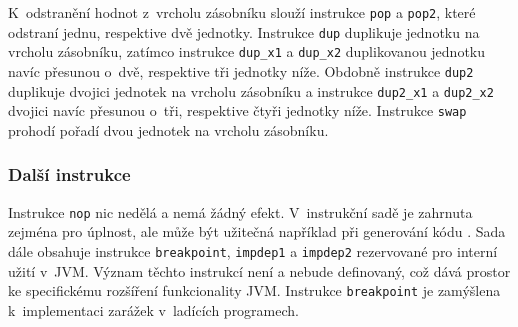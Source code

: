 K~odstranění hodnot z~vrcholu zásobníku slouží instrukce \texttt{pop} a \texttt{pop2}, které odstraní jednu, respektive dvě jednotky. Instrukce \texttt{dup} duplikuje jednotku na vrcholu zásobníku, zatímco instrukce \texttt{dup\_x1} a \texttt{dup\_x2} duplikovanou jednotku navíc přesunou o~dvě, respektive tři jednotky níže. Obdobně instrukce \texttt{dup2} duplikuje dvojici jednotek na vrcholu zásobníku a instrukce \texttt{dup2\_x1} a \texttt{dup2\_x2} dvojici navíc přesunou o~tři, respektive čtyři jednotky níže. Instrukce 
\texttt{swap} prohodí pořadí dvou jednotek na vrcholu zásobníku.

\subsubsection{Další instrukce}

Instrukce \texttt{nop} nic nedělá a nemá žádný efekt. V~instrukční sadě je zahrnuta zejména pro úplnost, ale může být užitečná například při generování kódu \cite{}.
Sada dále obsahuje instrukce \texttt{breakpoint}, \texttt{impdep1} a \texttt{impdep2} rezervované pro interní užití v~JVM. Význam těchto instrukcí není a nebude definovaný, což dává prostor ke specifickému rozšíření funkcionality JVM. Instrukce \texttt{breakpoint} je zamýšlena k~implementaci zarážek v~ladících programech. 















